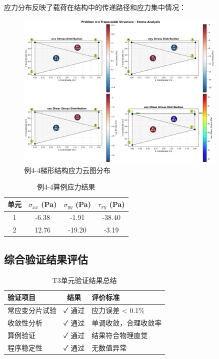 \documentclass[12pt,a4paper]{article}
\begin{document}
应力分布反映了载荷在结构中的传递路径和应力集中情况：

\begin{figure}[H]
\centering
\includegraphics[width=0.9\textwidth]{img/wzy_stress_analysis.png}
\caption{例4-4梯形结构应力云图分布}
\label{fig:wzy_stress}
\end{figure}

\begin{table}[H]
\centering
\caption{例4-4算例应力结果}
\begin{tabular}{cccc}
\toprule
单元 & $\sigma_{xx}$ (Pa) & $\sigma_{yy}$ (Pa) & $\tau_{xy}$ (Pa) \\
\midrule
1 & -6.38 & -1.91 & -38.40 \\
2 & 12.76 & -19.20 & -3.19 \\
\bottomrule
\end{tabular}
\end{table}

\subsection{综合验证结果评估}

\begin{table}[H]
\centering
\caption{T3单元验证结果总结}
\begin{tabular}{lcl}
\toprule
验证项目 & 结果 & 评价标准 \\
\midrule
常应变分片试验 & ✓ 通过 & 应力误差 < 0.1\% \\
收敛性分析 & ✓ 通过 & 单调收敛，合理收敛率 \\
算例验证 & ✓ 通过 & 结果符合物理直觉 \\
程序稳定性 & ✓ 通过 & 无数值异常 \\
\bottomrule
\end{tabular}
\end{table}
\end{document}
